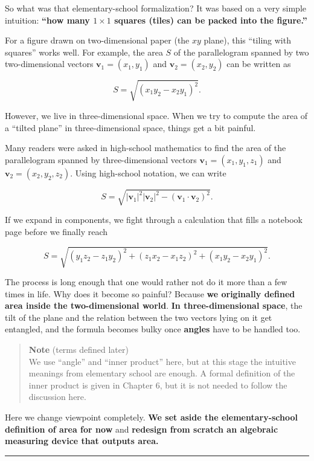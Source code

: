 So what was that elementary-school formalization? It was based on a very
simple intuition: \textbf{``how many \(1\times 1\) squares (tiles) can
be packed into the figure.''}

For a figure drawn on two-dimensional paper (the \(xy\) plane), this
``tiling with squares'' works well. For example, the area \(S\) of the
parallelogram spanned by two two-dimensional vectors
\(\mathbf{v}_1=(x_1,y_1)\) and \(\mathbf{v}_2=(x_2,y_2)\) can be written
as

\[S=\sqrt{(x_1 y_2-x_2 y_1)^2}.\]

However, we live in three-dimensional space. When we try to compute the
area of a ``tilted plane'' in three-dimensional space, things get a bit
painful.

Many readers were asked in high-school mathematics to find the area of
the parallelogram spanned by three-dimensional vectors
\(\mathbf{v}_1=(x_1,y_1,z_1)\) and \(\mathbf{v}_2=(x_2,y_2,z_2)\). Using
high-school notation, we can write

\[
S=\sqrt{|\mathbf{v}_1|^2|\mathbf{v}_2|^2-(\mathbf{v}_1\cdot\mathbf{v}_2)^2}.
\]

If we expand in components, we fight through a calculation that fills a
notebook page before we finally reach

\[S=\sqrt{(y_1 z_2-z_1 y_2)^2+(z_1 x_2-x_1 z_2)^2+(x_1 y_2-x_2 y_1)^2}.\]

The process is long enough that one would rather not do it more than a
few times in life. Why does it become so painful? Because
\textbf{we originally defined area inside the two-dimensional world}.
\textbf{In three-dimensional space}, the tilt of the plane and the
relation between the two vectors lying on it get entangled, and the
formula becomes bulky once \textbf{angles} have to be handled too.

\begin{quote}
\textbf{Note} (terms defined later)\\
We use ``angle'' and ``inner product'' here, but at this stage the
intuitive meanings from elementary school are enough. A formal
definition of the inner product is given in Chapter 6, but it is not
needed to follow the discussion here.
\end{quote}

Here we change viewpoint completely.
\textbf{We set aside the elementary-school definition of area for now}
and
\textbf{redesign from scratch an algebraic measuring device that outputs area.}

\begin{center}\rule{0.5\linewidth}{0.5pt}\end{center}

